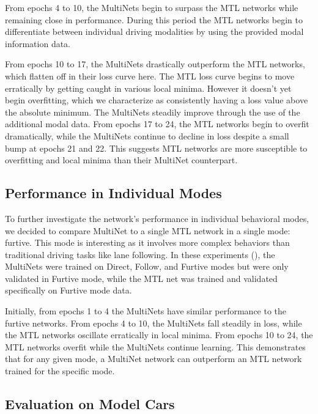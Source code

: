 From epochs 4 to 10, the MultiNets begin to surpass the MTL networks while remaining close in performance. During this period the MTL networks begin to differentiate between individual driving modalities by using the provided modal information data.

From epochs 10 to 17, the MultiNets drastically outperform the MTL networks, which flatten off in their loss curve here. The MTL loss curve begins to move erratically by getting caught in various local minima. However it doesn't yet begin overfitting, which we characterize as consistently having a loss value above the absolute minimum. The MultiNets steadily improve through the use of the additional modal data. From epochs 17 to 24, the MTL networks begin to overfit dramatically, while the MultiNets continue to decline in loss despite a small bump at epochs 21 and 22. This suggests MTL networks are more susceptible to overfitting and local minima than their MultiNet counterpart.

\subsection{Performance in Individual Modes}

To further investigate the network's performance in individual behavioral modes, we decided to compare MultiNet to a single MTL network in a single mode: furtive. This mode is interesting as it involves more complex behaviors than traditional driving tasks like lane following. In these experiments (), the MultiNets were trained on Direct, Follow, and Furtive modes but were only validated in Furtive mode, while the MTL net was trained and validated specifically on Furtive mode data.

Initially, from epochs 1 to 4 the MultiNets have similar performance to the furtive networks. From epochs 4 to 10, the MultiNets fall steadily in loss, while the MTL networks oscillate erratically in local minima. From epochs 10 to 24, the MTL networks overfit while the MultiNets continue learning. This demonstrates that for any given mode, a MultiNet network can outperform an MTL network trained for the specific mode.


\subsection{Evaluation on Model Cars}

